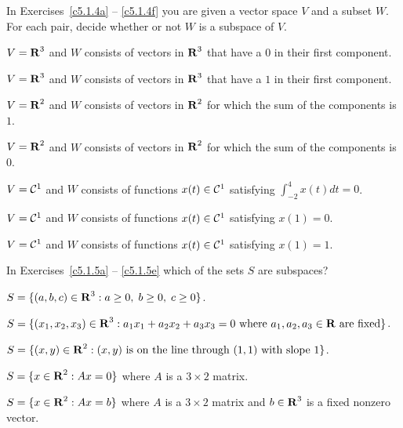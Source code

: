 \noindent In Exercises~\ref{c5.1.4a} -- \ref{c5.1.4f} you are given a
vector space $V$ and a subset $W$.  For each pair, decide whether or
not $W$ is a subspace of $V$.
\begin{exercise} \label{c5.1.4a}
$V=\mbox{$\bf{R}$}^3$ and $W$ consists of vectors in $\mbox{$\bf{R}$}^3$
     that have a $0$ in their first component.
\end{exercise}
\begin{exercise} \label{c5.1.4b}
$V=\mbox{$\bf{R}$}^3$ and $W$ consists of vectors in $\mbox{$\bf{R}$}^3$
     that have a $1$ in their first component.
\end{exercise}
\begin{exercise} \label{c5.1.4d}
$V=\mbox{$\bf{R}$}^2$ and $W$ consists of vectors in $\mbox{$\bf{R}$}^2$
     for which the sum of the components is $1$.
\end{exercise}
\begin{exercise} \label{c5.1.4c}
$V=\mbox{$\bf{R}$}^2$ and $W$ consists of vectors in $\mbox{$\bf{R}$}^2$
     for which the sum of the components is $0$.
\end{exercise}
\begin{exercise} \label{c5.1.4g}
$V={\cal C}^1$ and $W$ consists of functions
     $x(t)\in{\cal C}^1$ satisfying $\int_{-2}^4x(t)dt =0$.
\end{exercise}
\begin{exercise} \label{c5.1.4e}
$V={\cal C}^1$ and $W$ consists of functions
     $x(t)\in{\cal C}^1$ satisfying $x(1)=0$.
\end{exercise}
\begin{exercise} \label{c5.1.4f}
$V={\cal C}^1$ and $W$ consists of functions
     $x(t)\in{\cal C}^1$ satisfying $x(1)=1$.
\end{exercise}

\noindent In Exercises~\ref{c5.1.5a} -- \ref{c5.1.5e} which of the
sets $S$ are subspaces?
\begin{exercise} \label{c5.1.5a}
$S = \{(a,b,c)\in\mbox{$\bf{R}$}^3 : a\ge 0, \; b\ge 0,\; c\ge 0\}$.
\end{exercise}
\begin{exercise} \label{c5.1.5b}
$S = \{(x_1,x_2,x_3)\in\mbox{$\bf{R}$}^3 : a_1x_1+a_2x_2+a_3x_3=0
\mbox{ where } a_1,a_2,a_3\in\mbox{$\bf{R}$} \mbox{ are fixed}\}$.
\end{exercise}
\begin{exercise} \label{c5.1.5c}
$S = \{(x,y)\in\mbox{$\bf{R}$}^2: (x,y) \mbox{ is on the line through }
(1,1) \mbox{ with slope } 1\}$.
\end{exercise}
\begin{exercise} \label{c5.1.5d}
$S = \{x\in\mbox{$\bf{R}$}^2: Ax=0\}$ where $A$ is a $3\times 2$ matrix.
\end{exercise}
\begin{exercise} \label{c5.1.5e}
$S = \{x\in\mbox{$\bf{R}$}^2: Ax=b\}$ where $A$ is a $3\times 2$ matrix
	and $b\in\mbox{$\bf{R}$}^3$ is a fixed nonzero vector.
\end{exercise}

